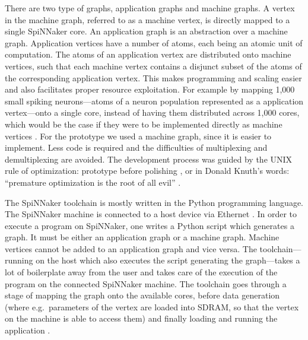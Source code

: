 \documentclass[]{article}
\begin{document}
There are two type of graphs, application graphs and machine graphs.
A vertex in the machine graph, referred to as a machine vertex, is
directly mapped to a single SpiNNaker core.
An application graph is an abstraction over a machine graph.
Application vertices have a number of atoms, each being an atomic unit
of computation.
The atoms of an application vertex are distributed onto machine
vertices, such that each machine vertex contains a disjunct subset
of the atoms of the corresponding application vertex.
This makes programming and scaling easier and also facilitates proper
resource exploitation.
For example by mapping 1,000 small spiking
neurons---atoms of a neuron population represented as a application
vertex---onto a single core, instead of having them distributed across
1,000 cores, which would be the case if they were to be implemented
directly as machine vertices \citep{furber_et_al_2020}.
For the prototype we used a machine graph, since it is easier to
implement.
Less code is required and the difficulties of multiplexing and
demultiplexing are avoided.
The development process was guided by the UNIX rule of optimization:
prototype before polishing \citep{raymond_2003}, or in Donald Knuth's
words: ``premature optimization is the root of all evil''
\citep{knuth_1974}.

The SpiNNaker toolchain is mostly written in the Python programming
language.
The SpiNNaker machine is connected to a host device via Ethernet
\citep{rowley_et_al_2019}.
In order to execute a program on SpiNNaker, one writes a Python
script which generates a graph.
It must be either an application graph or a machine graph.
Machine vertices cannot be added to an application graph and vice
versa.
The toolchain---running on the host which also executes the script
generating the graph---takes a lot of boilerplate away from the user
and takes care of the execution of the program on the connected
SpiNNaker machine.
The toolchain goes through a stage of mapping the graph onto the
available cores, before data generation (where e.g.\ parameters of the
vertex are loaded into SDRAM, so that the vertex on the machine is
able to access them) and finally loading and running the
application \citep{furber_et_al_2020}.
\end{document}
